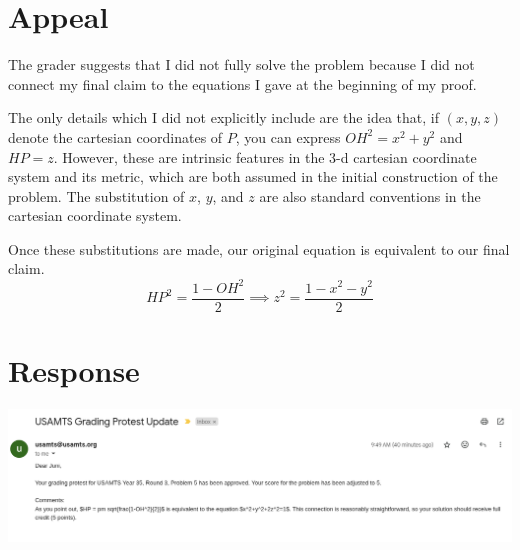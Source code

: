 \documentclass{article}
\begin{document}
\section{Appeal}

The grader suggests that I did not fully solve the problem because I did not connect my final claim to the equations I gave at the beginning of my proof.

The only details which I did not explicitly include are the idea that, if $(x,y,z)$ denote the cartesian coordinates of $P$, you can express $OH^2 = x^2+y^2$ and $HP = z$.
However, these are intrinsic features in the 3-d cartesian coordinate system and its metric, which are both assumed in the initial construction of the problem.
The substitution of $x$, $y$, and $z$ are also standard conventions in the cartesian coordinate system.

Once these substitutions are made, our original equation is equivalent to our final claim.
$$HP^2 = \frac{1-OH^2}{2} \implies z^2 = \frac{1-x^2-y^2}{2}$$

\section{Response}

\includegraphics[width=\textwidth]{round3/p5_appeal_response.png}
\end{document}
